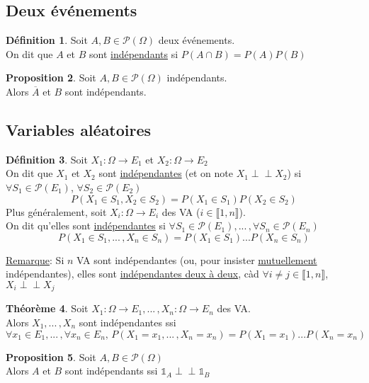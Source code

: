 \documentclass[10pt,a4paper]{article}
\theoremstyle{definition}
\newtheorem{proposition}{Proposition}[section]
\newtheorem{theorem}[proposition]{Théorème}
\newtheorem{definition}[proposition]{Définition}
\newcommand{\indep}{\mathrel{\perp \!\!\! \perp}}
\begin{document}
\subsection{Deux événements}
\begin{definition}
Soit $A, B \in \mathcal{P}(\Omega)$ deux événements. \\
On dit que $A$ et $B$ sont \uline{indépendants} si $P(A \cap B) = P(A) P(B)$
\end{definition}
\begin{proposition}
Soit $A, B \in \mathcal{P}(\Omega)$ indépendants. \\
Alors $\overline{A}$ et $B$ sont indépendants.
\end{proposition}

\subsection{Variables aléatoires}
\begin{definition}
Soit $X_1: \Omega \to E_1$ et $X_2: \Omega \to E_2$ \\
On dit que $X_1$ et $X_2$ sont \uline{indépendantes} (et on note $X_1 \indep X_2$) si $\forall S_1 \in \mathcal{P}(E_1)$, $\forall S_2 \in \mathcal{P}(E_2)$
\[ P(X_1 \in S_1, X_2 \in S_2) = P(X_1 \in S_1) P(X_2 \in S_2) \]
Plus généralement, soit $X_i: \Omega \to E_i$ des VA ($i \in \llbracket 1, n \rrbracket$). \\
On dit qu'elles sont \uline{indépendantes} si $\forall S_1 \in \mathcal{P}(E_1), ...\,, \forall S_n \in \mathcal{P}(E_n)$
\[ P(X_1 \in S_1, ...\,, X_n \in S_n) = P(X_1 \in S_1) ... P(X_n \in S_n) \]
\end{definition}
\noindent \uline{Remarque}: Si $n$ VA sont indépendantes (ou, pour insister \uline{mutuellement} indépendantes), elles sont \uline{indépendantes deux à deux}, càd $\forall i \neq j \in \llbracket 1, n \rrbracket$, $X_i \indep X_j$
\begin{theorem}
Soit $X_1: \Omega \to E_1, ...\,, X_n: \Omega \to E_n$ des VA. \\
Alors $X_1, ...\,, X_n$ sont indépendantes ssi
\[ \forall x_1 \in E_1, ...\,, \forall x_n \in E_n,\, P(X_1 = x_1, ...\,, X_n = x_n) = P(X_1 = x_1) ... P(X_n = x_n) \]
\end{theorem}
\begin{proposition}
Soit $A, B \in \mathcal{P}(\Omega)$ \\
Alors $A$ et $B$ sont indépendants ssi $\mathds{1}_A \indep \mathds{1}_B$
\end{proposition}
\end{document}
